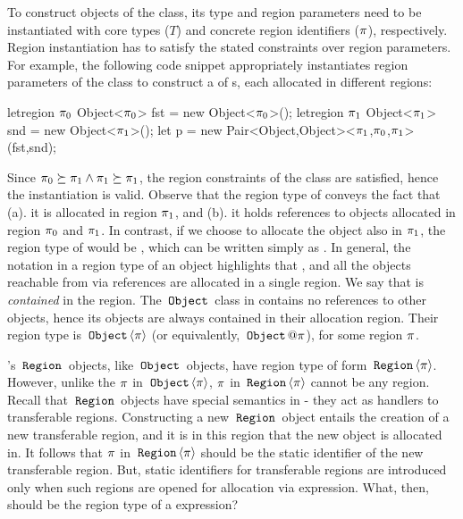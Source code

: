 To construct objects of the  class, its type and region
parameters need to be instantiated with core types ($T$) and concrete
region identifiers ($\pi$), respectively. Region instantiation has to
satisfy the stated constraints over region parameters. For example,
the following code snippet appropriately instantiates region
parameters of the  class to construct a  of
{\ObjZ}{\!}s, each allocated in different regions:
\begin{codejava}
letregion $\pi_0$ {
  Object<$\pi_0$> fst = new Object<$\pi_0$>();
  letregion $\pi_1$ {
    Object<$\pi_1$> snd = new Object<$\pi_1$>();
    let p = new Pair<Object,Object><$\pi_1$,$\pi_0$,$\pi_1$>
                  (fst,snd);
  }
}
\end{codejava}
Since $\pi_0 \succeq \pi_1 \wedge \pi_1 \succeq \pi_1$, the
region constraints of the  class are satisfied, hence the
instantiation is valid. Observe that the region type of  conveys
the fact that (a). it is allocated in region $\pi_1$, and (b). it
holds references to objects allocated in region $\pi_0$ and $\pi_1$.
In contrast, if we choose to allocate the  object also in
$\pi_1$, the region type of  would be
, which can be
written simply as . In general, the
 notation in a region type of an object  highlights that
, and all the objects reachable from  via references are
allocated in a single region. We say that  is \emph{contained} in
the region. The $\,{\tt Object}\,$ class in \FB contains no references to other
objects, hence its objects are always contained in their allocation
region. Their region type is $\,{\tt Object}\,\langle \pi \rangle$ (or equivalently,
$\ObjZ@\rgn$), for some region $\pi$.

\FB's $\,{\tt Region}\,$ objects, like $\,{\tt Object}\,$ objects, have region type of form
$\,{\tt Region}\,\langle \pi \rangle$. However, unlike the $\pi$ in
$\,{\tt Object}\,\langle \pi \rangle$, $\pi$ in $\,{\tt Region}\,\langle \pi \rangle$ cannot be any
region. Recall that $\,{\tt Region}\,$ objects have special semantics in \name -
they act as handlers to transferable regions.  Constructing a new
$\,{\tt Region}\,$ object entails the creation of a new transferable region, and
it is in this region that the new object is allocated in. It follows
that $\pi$ in $\,{\tt Region}\,\langle \pi \rangle$ should be the static identifier of
the new transferable region. But, static identifiers for transferable
regions are introduced only when such regions are opened for
allocation via  expression. What, then, should be the region
type of a  expression?

